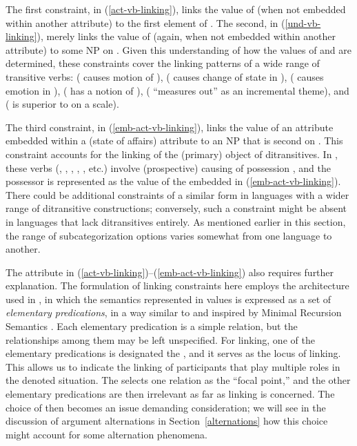 \documentclass[output=paper,biblatex,babelshorthands,newtxmath,draftmode,colorlinks, citecolor=brown]{langscibook}
\begin{document}
\largerpage[2]
\noindent
The first constraint, in (\ref{act-vb-linking}), links the value of  (when not embedded
within another attribute) to the first element of \argst.  The second, in (\ref{und-vb-linking}),
merely links the value of  (again, when not embedded within another attribute) to some NP
on \argst.  Given this understanding of how the values of  and  are determined,
these constraints cover the linking patterns of a wide range of transitive verbs: 
( causes motion of ),  ( causes change of state in
),  ( causes emotion in ),  (
has a notion of ),  ( ``measures out''  as an
incremental theme), and  ( is superior to  on a scale).

The third constraint, in (\ref{emb-act-vb-linking}), links the value of an  attribute
embedded within a  (state of affairs)
attribute to an NP that is second on \argst.  This constraint accounts for the linking of the
(primary) object of ditransitives. In , these verbs (,
, , , , etc.) involve (prospective) causing of possession
\citep{Pinker1989,Goldberg1995}, and the possessor is represented as the value of the embedded
 in (\ref{emb-act-vb-linking}).  There could be additional constraints of a similar form
in languages with a wider range of ditransitive constructions; conversely, such a constraint might
be absent in languages that lack ditransitives entirely.  As mentioned earlier in this section, the
range of subcategorization options varies somewhat from one language to another.

The  attribute in (\ref{act-vb-linking})--(\ref{emb-act-vb-linking}) also requires further
explanation. The formulation of linking constraints here employs the architecture used
in \citet{KoenigandDavis2006}, in which the semantics represented in \content values is expressed as
a set of \emph{elementary predications}, in a way similar to and inspired by Minimal Recursion Semantics
\citep{Copestakeetal2001,Copestakeetal2005}.  Each elementary predication is a simple relation, but
the relationships among them may be left unspecified.  For linking, one of the elementary
predications is designated the , and it serves as the locus of linking.  This allows us to
indicate the linking of participants that play multiple roles in the denoted situation. 
The  selects one relation as the ``focal point,'' and the other elementary predications
are then irrelevant as far as linking is concerned. The choice of  then becomes an issue
demanding consideration; we will see in the discussion of argument alternations in
Section~\ref{alternations} how this choice might account for some alternation phenomena. 
\end{document}
